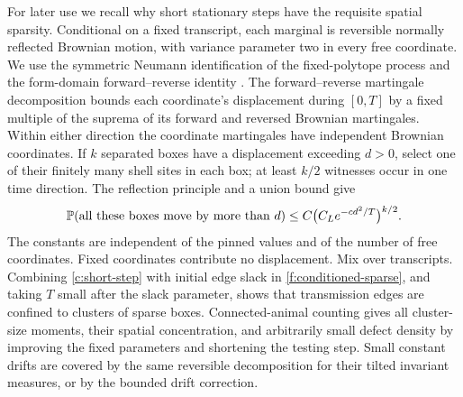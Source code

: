 For later use we recall why short stationary steps have the requisite
spatial sparsity. Conditional on a fixed transcript, each marginal is
reversible normally reflected Brownian motion, with variance parameter
two in every free coordinate. We use the symmetric Neumann
identification of the fixed-polytope process \cite{BassHsu} and the
form-domain forward--reverse identity \cite[Section 1, equation
(1.5)]{LyonsZheng}. The forward--reverse martingale
decomposition bounds each coordinate's displacement during $[0,T]$
by a fixed multiple of the suprema of its forward and reversed Brownian
martingales. Within either direction the coordinate martingales have
independent Brownian coordinates. If $k$ separated boxes have a
displacement exceeding $d>0$, select one of their finitely many shell
sites in each box; at least $k/2$ witnesses occur in one time direction.
The reflection principle and a union bound give
\begin{equation}\label{c:short-step}
 \mathbb P(\hbox{all these boxes move by more than }d)
 \le C\bigl(C_L e^{-c d^2/T}\bigr)^{k/2}.
\end{equation}
The constants are independent of the pinned values and of the number
of free coordinates. Fixed coordinates contribute no displacement.
Mix over transcripts. Combining \eqref{c:short-step} with initial edge
slack in \ref{f:conditioned-sparse}, and taking $T$ small after the slack parameter,
shows that transmission edges are confined to clusters of sparse boxes.
Connected-animal counting gives all cluster-size moments, their spatial
concentration, and arbitrarily small defect density by improving the
fixed parameters and shortening the testing step. Small constant drifts
are covered by the same reversible decomposition for their tilted
invariant measures, or by the bounded drift correction.

